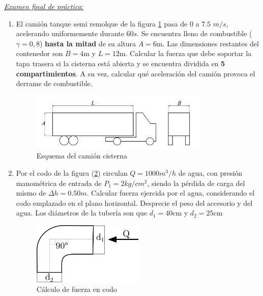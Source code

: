 \documentclass[a4paper,10pt]{article}
\begin{document}
\noindent\underline{\textit{Examen final de práctica}:}

\begin{enumerate}
\item El camión tanque semi remolque de la figura \ref{fig:remolque} pasa de $0$ a $7.5$ $m/s$, acelerando uniformemente durante $60s$. Se encuentra lleno de combustible ($\gamma=0,8$) \textbf{hasta la mitad} de su altura $A = 6$m. Las dimensiones restantes del contenedor son $B = 4$m y $L = 12$m. Calcular la fuerza que debe soportar la tapa trasera si la cisterna est\'a abierta y se encuentra dividida en \textbf{5 compartimientos}. A su vez, calcular qué aceleración del camión provoca el derrame de combustible.
  \begin{figure}[!ht]
    \centering
    \includegraphics[width=0.8\textwidth]{camionCisterna.png}
    \caption{Esquema del camión cisterna}
    \label{fig:remolque}
  \end{figure}
  
\item Por el codo de la figura (\ref{fig:codo}) circulan $Q=1000 m^3/h$ de agua, con presión manométrica de entrada de $P_1 = 2 kg/cm^2$, siendo la pérdida de carga del mismo  de $\Delta h = 0.50m$. Calcular fuerza ejercida por el agua, considerando el codo emplazado en el plano horizontal. Desprecie el peso del accesorio y del agua. Los diámetros de la tubería son que $d_1=40$cm y $d_2=25$cm
  \vspace{0.5cm}
  \begin{figure}[h!!]
  \centering
   \includegraphics[width=0.5\textwidth]{codo.pdf}
  \caption{Cálculo de fuerza en codo}
  \label{fig:codo}
  \end{figure}  


\end{enumerate}
\end{document}
